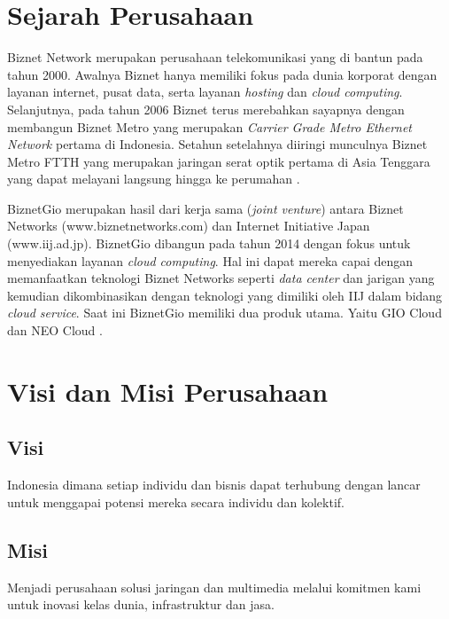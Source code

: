 

\section{Sejarah Perusahaan}

Biznet Network merupakan perusahaan telekomunikasi yang di bantun pada
tahun 2000. Awalnya Biznet hanya memiliki fokus pada dunia korporat dengan
layanan internet, pusat data, serta layanan \emph{hosting} dan
\emph{cloud computing}. Selanjutnya, pada tahun 2006 Biznet terus
merebahkan sayapnya dengan membangun Biznet Metro yang merupakan
\emph{Carrier Grade Metro Ethernet Network} pertama di
Indonesia. Setahun setelahnya diiringi munculnya Biznet Metro FTTH
yang merupakan jaringan serat optik pertama di Asia Tenggara yang
dapat melayani langsung hingga ke perumahan \parencite{biznetgio}.

BiznetGio merupakan hasil dari kerja sama (\emph{joint venture})
antara Biznet Networks (www.biznetnetworks.com) dan Internet
Initiative Japan (www.iij.ad.jp). BiznetGio dibangun pada tahun 2014
dengan fokus untuk menyediakan layanan \emph{cloud computing}. Hal ini
dapat mereka capai dengan memanfaatkan teknologi Biznet Networks
seperti \emph{data center} dan jarigan yang kemudian dikombinasikan dengan
teknologi yang dimiliki oleh IIJ dalam bidang \emph{cloud service}.
Saat ini BiznetGio memiliki dua produk utama. Yaitu GIO Cloud dan NEO
Cloud \parencite{biznetgio}.

\section{Visi dan Misi Perusahaan}

\subsection{Visi}
Indonesia dimana setiap individu dan bisnis dapat terhubung dengan
lancar untuk menggapai potensi mereka secara individu dan kolektif.

\subsection{Misi}
Menjadi perusahaan solusi jaringan dan multimedia melalui komitmen
kami untuk inovasi kelas dunia, infrastruktur dan jasa.

